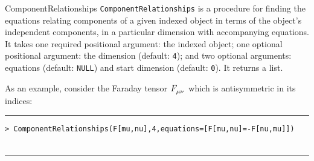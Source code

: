 \documentclass{article}
\begin{document}
\begin{macro}{ComponentRelationships}
\verb~ComponentRelationships~ is a procedure for finding the equations relating components of a given indexed object in terms of the object's independent components, in a particular dimension with accompanying equations. It takes one required positional argument: the indexed object; one optional positional argument: the dimension (default: \verb~4~); and two optional arguments: equations (default: \verb~NULL~) and start dimension (default: \verb~0~). It returns a list. 

As an example, consider the Faraday tensor $\tensor{F}{_\mu_\nu}$ which is antisymmetric in its indices:
\newline\rule{\linewidth}{0.4pt}
\begin{verbatim}
> ComponentRelationships(F[mu,nu],4,equations=[F[mu,nu]=-F[nu,mu]])
\end{verbatim}
\begin{multline*}
[F_{0,0} = 0, F_{0,1} = -F_{1,0}, F_{0,2} = -F_{2,0}, F_{0,3} = -F_{3,0}, \\ F_{1,1} = 0, F_{1,2} = -F_{2,1}, F_{1,3} = -F_{3,1}, F_{2,2}
 = 0, F_{2,3} = -F_{3,2}, F_{3,3} = 0]
\end{multline*}
\newline\rule{\linewidth}{0.4pt}
\end{macro}
\end{document}
